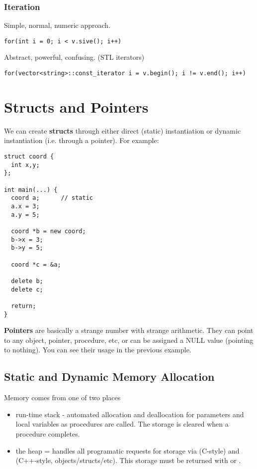 \documentclass[12pt]{article}
\begin{document}
\subsubsection*{Iteration}
Simple, normal, numeric approach.
\begin{verbatim}
for(int i = 0; i < v.sive(); i++)
\end{verbatim}

Abstract, powerful, confusing. (STL iterators)
\begin{verbatim}
for(vector<string>::const_iterator i = v.begin(); i != v.end(); i++)
\end{verbatim}

\section*{Structs and Pointers}
We can create {\bf structs} through either direct (static) instantiation or dynamic instantiation (i.e. through a pointer). For example:

\begin{verbatim}
struct coord {
  int x,y;
};

int main(...) {
  coord a;      // static
  a.x = 3;
  a.y = 5;
  
  coord *b = new coord;
  b->x = 3;
  b->y = 5;
  
  coord *c = &a;
  
  delete b;
  delete c;
  
  return;
}
\end{verbatim}

{\bf Pointers} are basically a strange number with strange arithmetic. They can point to any object, pointer, procedure, etc, or can be assigned a NULL value (pointing to nothing). You can see their usage in the previous example.

\subsection*{Static and Dynamic Memory Allocation}
Memory comes from one of two places
\begin{itemize}
\item run-time stack - automated allocation and deallocation for parameters and local variables as procedures are called. The storage is cleared when a procedure completes.
\item the heap = handles all programatic requests for storage via  (C-style) and  (C++-style, objects/structs/etc). This storage must be returned with  or .
\end{itemize}
\end{document}
